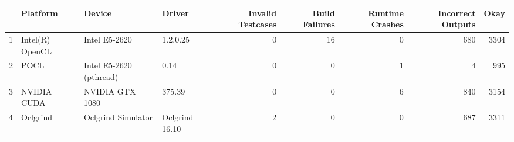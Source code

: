 \begin{tabular}{llllrrrrr}
\toprule
{} &         Platform &                   Device &          Driver &  Invalid Testcases &  Build Failures &  Runtime Crashes &  Incorrect Outputs &  Okay \\
\midrule
1 &  Intel(R) OpenCL &            Intel E5-2620 &        1.2.0.25 &                  0 &              16 &                0 &                680 &  3304 \\
2 &             POCL &  Intel E5-2620 (pthread) &            0.14 &                  0 &               0 &                1 &                  4 &   995 \\
3 &      NVIDIA CUDA &          NVIDIA GTX 1080 &          375.39 &                  0 &               0 &                6 &                840 &  3154 \\
4 &         Oclgrind &       Oclgrind Simulator &  Oclgrind 16.10 &                  2 &               0 &                0 &                687 &  3311 \\
\bottomrule
\end{tabular}
